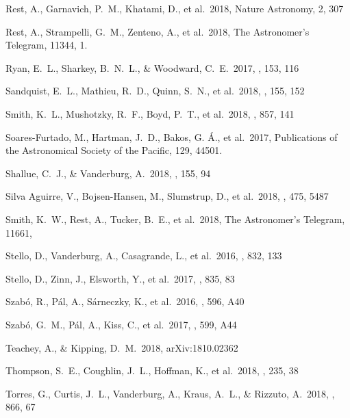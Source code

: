 \documentclass[modern]{aastex62}
\begin{document}
\begin{thebibliography}{}
 Rest, A., Garnavich, P.~M., Khatami, D., et al.\ 2018, Nature Astronomy, 2, 307 

 Rest, A., Strampelli, G.~M., Zenteno, A., et al.\ 2018, The Astronomer's Telegram, 11344, 1.

 Ryan, E.~L., Sharkey, B.~N.~L., \& Woodward, C.~E.\ 2017, \aj, 153, 116 

 Sandquist, E.~L., Mathieu, R.~D., Quinn, S.~N., et al.\ 2018, \aj, 155, 152 

 Smith, K.~L., Mushotzky, R.~F., Boyd, P.~T., et al.\ 2018, \apj, 857, 141 

 Soares-Furtado, M., Hartman, J.~D., Bakos, G. {\'A}., et al.\ 2017, Publications of the Astronomical Society of the Pacific, 129, 44501.

 Shallue, C.~J., \& Vanderburg, A.\ 2018, \aj, 155, 94 

 Silva Aguirre, V., Bojsen-Hansen, M., Slumstrup, D., et al.\ 2018, \mnras, 475, 5487 

 Smith, K.~W., Rest, A., Tucker, B.~E., et al.\ 2018, The Astronomer's Telegram, 11661,  

 Stello, D., Vanderburg, A., Casagrande, L., et al.\ 2016, \apj, 832, 133 

 Stello, D., Zinn, J., Elsworth, Y., et al.\ 2017, \apj, 835, 83 

 Szab{\'o}, R., P{\'a}l, A., S{\'a}rneczky, K., et al.\ 2016, \aap, 596, A40 

 Szab{\'o}, G.~M., P{\'a}l, A., Kiss, C., et al.\ 2017, \aap, 599, A44 

 Teachey, A., \& Kipping, D.~M.\ 2018, arXiv:1810.02362 

 Thompson, S.~E., Coughlin, J.~L., Hoffman, K., et al.\ 2018, \apjs, 235, 38 

 Torres, G., Curtis, J.~L., Vanderburg, A., Kraus, A.~L., \& Rizzuto, A.\ 2018, \apj, 866, 67 


\end{thebibliography}
\end{document}
